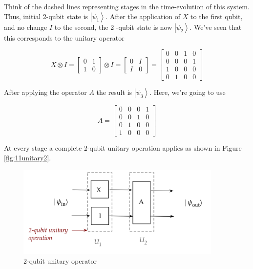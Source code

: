 \documentclass[main.tex]{subfiles}
\begin{document}
    Think of the dashed lines representing stages in the time-evolution of this system. Thus, initial 2-qubit state is $\left|\psi_{1}\right\rangle$. After the application of $X$ to the first qubit, and no change $I$ to the second, the 2 -qubit state is now $\left|\psi_{2}\right\rangle$. We've seen that this corresponds to the unitary operator
    
    $$
    X \otimes I=\left[\begin{array}{ll}
    0 & 1 \\
    1 & 0
    \end{array}\right] \otimes I=\left[\begin{array}{ll}
    0 & I \\
    I & 0
    \end{array}\right]=\left[\begin{array}{llll}
    0 & 0 & 1 & 0 \\
    0 & 0 & 0 & 1 \\
    1 & 0 & 0 & 0 \\
    0 & 1 & 0 & 0
    \end{array}\right]
    $$
    
    After applying the operator $A$ the result is $\left|\psi_{3}\right\rangle$. Here, we're going to use
    
    $$
    A=\left[\begin{array}{llll}
    0 & 0 & 0 & 1 \\
    0 & 0 & 1 & 0 \\
    0 & 1 & 0 & 0 \\
    1 & 0 & 0 & 0
    \end{array}\right]
    $$
    
    At every stage a complete 2-qubit unitary operation applies as shown in Figure \ref{fig:11unitary2}.
    
    \begin{figure}
        \centering
        \includegraphics[width=4in]{notes/figs/n07/12unitary3.png}
        \caption{2-qubit unitary operator}
        \label{fig:12unitary3}
    \end{figure}
\end{document}
